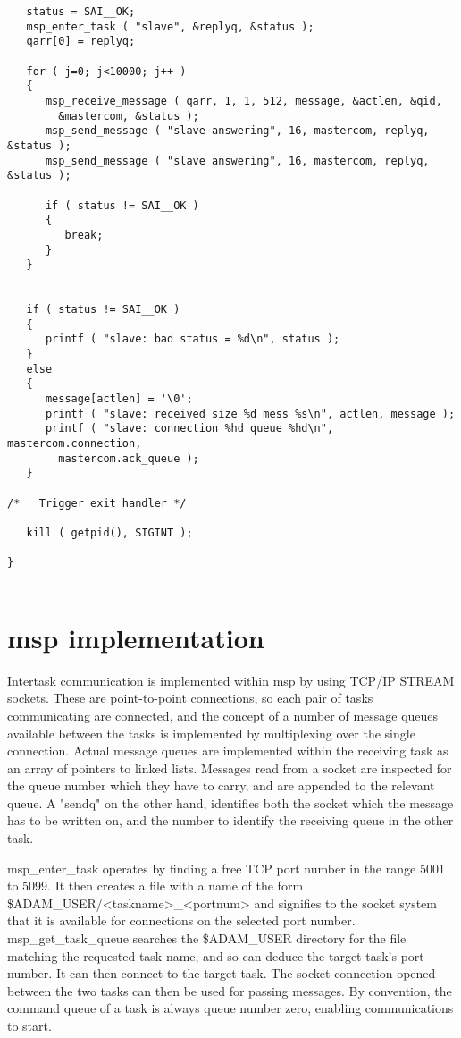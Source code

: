 \begin{verbatim}
   status = SAI__OK;
   msp_enter_task ( "slave", &replyq, &status );
   qarr[0] = replyq;

   for ( j=0; j<10000; j++ )
   {
      msp_receive_message ( qarr, 1, 1, 512, message, &actlen, &qid,
        &mastercom, &status );
      msp_send_message ( "slave answering", 16, mastercom, replyq, &status );
      msp_send_message ( "slave answering", 16, mastercom, replyq, &status );

      if ( status != SAI__OK )
      {
         break;
      }
   }


   if ( status != SAI__OK )
   {
      printf ( "slave: bad status = %d\n", status );
   }
   else
   {
      message[actlen] = '\0';
      printf ( "slave: received size %d mess %s\n", actlen, message );
      printf ( "slave: connection %hd queue %hd\n", mastercom.connection,
        mastercom.ack_queue ); 
   }

/*   Trigger exit handler */

   kill ( getpid(), SIGINT );

}


\end{verbatim}



\section {msp implementation}

Intertask communication is implemented within msp by using TCP/IP STREAM
sockets. These are point-to-point connections, so each pair of tasks
communicating are connected, and the concept of a number of message
queues available between the tasks is implemented by multiplexing over
the single connection. Actual message queues are implemented within the
receiving task as an array of pointers to linked lists. Messages read
from a socket are inspected for the queue number which they have to
carry, and are appended to the relevant queue. A "sendq" on the other
hand, identifies both the socket which the message has to be written on,
and the number to identify the receiving queue in the other task.

msp\_enter\_task operates by finding a free TCP port number in the range
5001 to 5099. It then creates a file with a name of the form
\$ADAM\_USER/<taskname>\_<portnum> and signifies to the socket system that
it is available for connections on the selected port number.
msp\_get\_task\_queue searches the \$ADAM\_USER directory for the file
matching the requested task name, and so can deduce the target task's
port number. It can then connect to the target task. The socket
connection opened between the two tasks can then be used for passing
messages. By convention, the command queue of a task is always queue
number zero, enabling communications to start.

